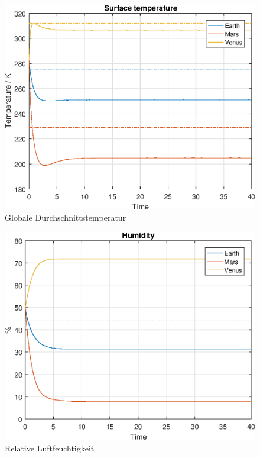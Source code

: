 \begin{refsection}
		\begin{figure}
			\center
			\includegraphics[height=0.45\textheight]{planeten/Matlab/figures/surfaceTemperature.eps}
			\caption{Globale Durchschnittstemperatur}
		\end{figure}
		
		\begin{figure}
			\center
			\includegraphics[height=0.45\textheight]{planeten/Matlab/figures/humidity.eps}
			\caption{Relative Luftfeuchtigkeit}
		\end{figure}
		

\end{refsection}
